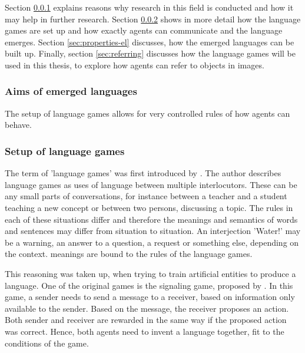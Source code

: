 Section \ref{sec:aims_languages} explains reasons why research in this field is conducted and how it may help in further research.
Section \ref{sec:setup-lg} shows in more detail how the language games are set up and how exactly agents can communicate and the language emerges.
Section \ref{sec:properties-el} discusses, how the emerged languages can be built up.
Finally, section \ref{sec:referring} discusses how the language games will be used in this thesis, to explore how agents can refer to objects in images.

\subsubsection{Aims of emerged languages}
\label{sec:aims_languages}
The setup of language games allows for very controlled rules of how agents can behave.


\subsubsection{Setup of language games}
\label{sec:setup-lg}
The term of 'language games' was first introduced by \citet{Wittgenstein1953}.
The author describes language games as uses of language between multiple interlocutors.
These can be any small parts of conversations, for instance between a teacher and a student teaching a new concept or between two persons, discussing a topic.
The rules in each of these situations differ and therefore the meanings and semantics of words and sentences may differ from situation to situation.
An interjection 'Water!' may be a warning, an answer to a question, a request or something else, depending on the context.
meanings are bound to the rules of the language games.

This reasoning was taken up, when trying to train artificial entities to produce a language.
One of the original games is the signaling game, proposed by \citet{Lewis1969}.
In this game, a sender needs to send a message to a receiver, based on information only available to the sender.
Based on the message, the receiver proposes an action.
Both sender and receiver are rewarded in the same way if the proposed action was correct.
Hence, both agents need to invent a language together, fit to the conditions of the game.

